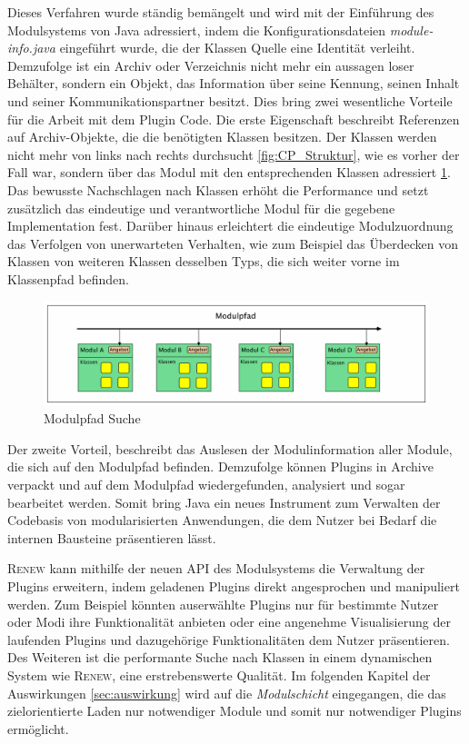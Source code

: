 		Dieses Verfahren wurde ständig bemängelt und wird mit der Einführung des Modulsystems von Java adressiert, indem die Konfigurationsdateien \textit{module-info.java} eingeführt wurde, die der Klassen Quelle eine Identität verleiht. Demzufolge ist ein Archiv oder Verzeichnis nicht mehr ein aussagen loser Behälter, sondern ein Objekt, das Information über seine Kennung, seinen Inhalt und seiner Kommunikationspartner besitzt.\newline
		Dies bring zwei wesentliche Vorteile für die Arbeit mit dem Plugin Code. Die erste Eigenschaft beschreibt Referenzen auf Archiv-Objekte, die die benötigten Klassen besitzen. Der Klassen werden nicht mehr von links nach rechts durchsucht \ref{fig:CP_Struktur}, wie es vorher der Fall war, sondern über das Modul mit den entsprechenden Klassen adressiert \ref{fig:MP_Struktur}.\cite{kothagal2017modular} \newline
		Das bewusste Nachschlagen nach Klassen erhöht die Performance und setzt zusätzlich das eindeutige und verantwortliche Modul für die gegebene Implementation fest. Darüber hinaus erleichtert die eindeutige Modulzuordnung das Verfolgen von unerwarteten Verhalten, wie zum Beispiel das Überdecken von Klassen von weiteren Klassen desselben Typs, die sich weiter vorne im Klassenpfad befinden.\bigbreak 
		\begin{figure}[h!]
		  \centering
		  \includegraphics[width=\textwidth]{material/images/Modulpfad.pdf}
		  \caption{Modulpfad Suche}
		  \label{fig:MP_Struktur}
		\end{figure}
		Der zweite Vorteil, beschreibt das Auslesen der Modulinformation aller Module, die sich auf den Modulpfad befinden. Demzufolge können Plugins in Archive verpackt und auf dem Modulpfad wiedergefunden, analysiert und sogar bearbeitet werden. Somit bring Java ein neues Instrument zum Verwalten der Codebasis von modularisierten Anwendungen, die dem Nutzer bei Bedarf die internen Bausteine präsentieren lässt.\bigbreak

		\textsc{Renew} kann mithilfe der neuen API des Modulsystems die Verwaltung der Plugins erweitern, indem geladenen Plugins direkt angesprochen und manipuliert werden. Zum Beispiel könnten auserwählte Plugins nur für bestimmte Nutzer oder Modi ihre Funktionalität anbieten oder eine angenehme Visualisierung der laufenden Plugins und dazugehörige Funktionalitäten dem Nutzer präsentieren. Des Weiteren ist die performante Suche nach Klassen in einem dynamischen System wie \textsc{Renew}, eine erstrebenswerte Qualität.  \newline
		Im folgenden Kapitel der Auswirkungen \ref{sec:auswirkung} wird auf die \textit{Modulschicht} eingegangen, die das zielorientierte Laden nur notwendiger Module und somit nur notwendiger Plugins ermöglicht.

